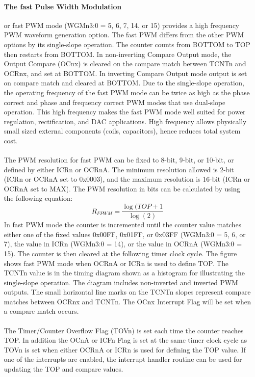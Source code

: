 \documentclass[english]{article}
\begin{document}
\paragraph{The fast Pulse Width Modulation}or fast PWM mode (WGMn3:0 = 5, 6, 7, 14, or 15) provides a high frequency PWM waveform generation option. The fast PWM differs from the other PWM options by its single-slope operation. The counter counts from BOTTOM to TOP then restarts from BOTTOM. In non-inverting Compare Output mode, the Output Compare (OCnx) is cleared on the compare match between TCNTn and OCRnx, and set at BOTTOM. In inverting Compare Output mode output is set on compare match and cleared at BOTTOM. Due to the single-slope operation, the operating frequency of the fast PWM mode can be twice as high as the phase correct and phase and frequency correct PWM modes that use dual-slope operation. This high frequency makes the fast PWM mode well suited for power regulation, rectification, and DAC applications. High frequency allows physically small sized external components (coils, capacitors), hence reduces total system cost.\\\\
The PWM resolution for fast PWM can be fixed to 8-bit, 9-bit, or 10-bit, or defined by either ICRn
or OCRnA. The minimum resolution allowed is 2-bit (ICRn or OCRnA set to 0x0003), and the maximum resolution is 16-bit (ICRn or OCRnA set to MAX). The PWM resolution in bits can be calculated by using the following equation:
$$
R_{FPWM}=\frac{\log(TOP+1}{\log(2)}
$$
In fast PWM mode the counter is incremented until the counter value matches either one of the
fixed values 0x00FF, 0x01FF, or 0x03FF (WGMn3:0 = 5, 6, or 7), the value in ICRn (WGMn3:0 = 14), or the value in OCRnA (WGMn3:0 = 15). The counter is then cleared at the following timer clock cycle. The figure shows fast PWM mode when OCRnA or ICRn is used to define TOP. The TCNTn value is in the timing diagram shown as a histogram for illustrating the single-slope operation. The diagram includes non-inverted and inverted PWM outputs. The small horizontal line marks on the TCNTn slopes represent compare matches between OCRnx and TCNTn. The OCnx Interrupt Flag will be set when a compare match occurs.\\\\
The Timer/Counter Overflow Flag (TOVn) is set each time the counter reaches TOP. In addition
the OCnA or ICFn Flag is set at the same timer clock cycle as TOVn is set when either OCRnA or ICRn is used for defining the TOP value. If one of the interrupts are enabled, the interrupt handler routine can be used for updating the TOP and compare values.\\\\
\end{document}
